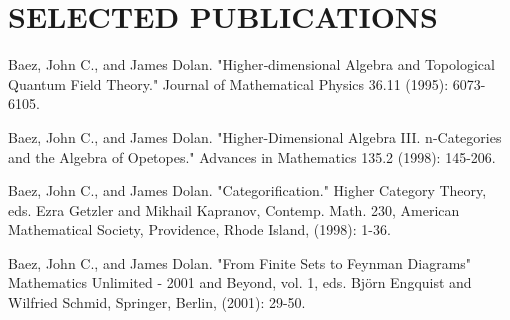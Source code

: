 \documentclass[a4paper,9pt]{extarticle}
\begin{document}
%
%


\section*{SELECTED PUBLICATIONS}

\noindent
Baez, John C., and James Dolan. 
"Higher‐dimensional Algebra and Topological Quantum Field Theory." 
Journal of Mathematical Physics 36.11 (1995): 6073-6105.

\noindent
Baez, John C., and James Dolan. 
"Higher-Dimensional Algebra III. n-Categories and the Algebra of Opetopes." 
Advances in Mathematics 135.2 (1998): 145-206.

\noindent
Baez, John C., and James Dolan. "Categorification." 
Higher Category Theory, eds. Ezra Getzler and Mikhail
Kapranov, Contemp. Math. 230, American Mathematical Society,
Providence, Rhode Island, (1998): 1-36.


\noindent
Baez, John C., and James Dolan. "From Finite Sets to Feynman Diagrams"
Mathematics Unlimited - 2001 and Beyond, vol. 1, eds.
Björn Engquist and Wilfried Schmid, Springer, Berlin, (2001): 29-50.
\end{document}
